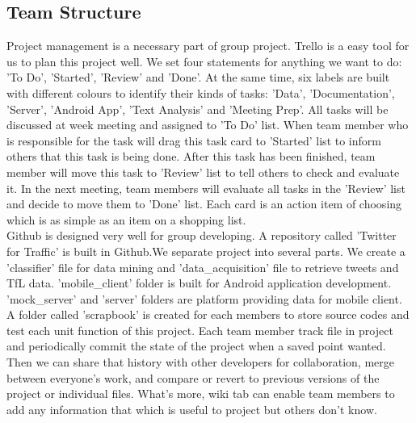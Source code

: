 \subsection{Team Structure}
Project management is a necessary part of group  project. Trello is a easy tool for us to plan this project well. We set four statements for anything we want to do: 'To Do', 'Started', 'Review' and 'Done'. At the same time, six labels are built with different colours to identify their kinds of tasks: 'Data', 'Documentation', 'Server', 'Android App', 'Text Analysis' and 'Meeting Prep'. All tasks will be discussed at week meeting and assigned to 'To Do' list. When team member who is responsible for the task will drag this task card to 'Started' list to inform others that this task is being done. After this task has been finished, team member will move this task to 'Review' list to tell others to check and evaluate it. In the next meeting, team members will evaluate all tasks in the 'Review' list and decide to move them to 'Done' list. Each card is an action item of choosing which is as simple as an item on a shopping list.\\
Github is designed very well for group developing. A repository called 'Twitter for Traffic' is built in Github.We separate project into several parts. We create a 'classifier' file for data mining and 'data\_acquisition' file to retrieve tweets and TfL data. 'mobile\_client' folder is built for Android application development. 'mock\_server' and 'server' folders are platform providing data for mobile client. A folder called 'scrapbook' is created for each members to store source codes and test each unit function of this project. Each team member track file in project and periodically commit the state of the project when a saved point wanted. Then we can share that history with other developers for collaboration, merge between everyone's work, and compare or revert to previous versions of the project or individual files. What's more, wiki tab can enable team members to add any information that which is useful to project but others don't know.
